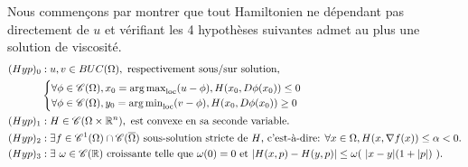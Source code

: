 Nous commençons par montrer que tout Hamiltonien ne dépendant pas directement de $u$ et vérifiant les 4 hypothèses suivantes admet au plus une solution de viscosité.
\begin{align*}  
    (Hyp)_0&: u,v \in BUC(\Omega), \text{ respectivement sous/sur solution,}\\
    &\begin{cases}
        \forall \phi \in \mathscr{C}(\Omega),x_0=\operatorname*{arg\,max}_{\text{loc}}(u-\phi),H(x_0,D\phi(x_0))\le 0\\
        \forall \phi \in \mathscr{C}(\Omega),y_0=\operatorname*{arg\,min}_{\text{loc}}(v-\phi),H(x_0,D\phi(x_0))\ge 0
    \end{cases}\\
    (Hyp)_1&: H\in \mathscr{C}(\Omega \times \mathbb{R}^n), \text{ est convexe en sa seconde variable.}\\
    (Hyp)_2&: \exists f\in \mathscr{C}^1(\Omega)\cap \mathscr{C}(\overline{\Omega}) \text{ sous-solution stricte de $H$, c'est-à-dire: }\forall x\in \Omega,H(x,\nabla f(x))\le \alpha <0.\\
    (Hyp)_3&: \exists \ \omega \in \mathscr{C}(\mathbb{R})\text{ croissante telle que } \omega (0)=0\text{ et }|H(x,p)-H(y,p)|\le \omega (\text{ } |x-y|(1+|p|)\text{ } ).
\end{align*}

